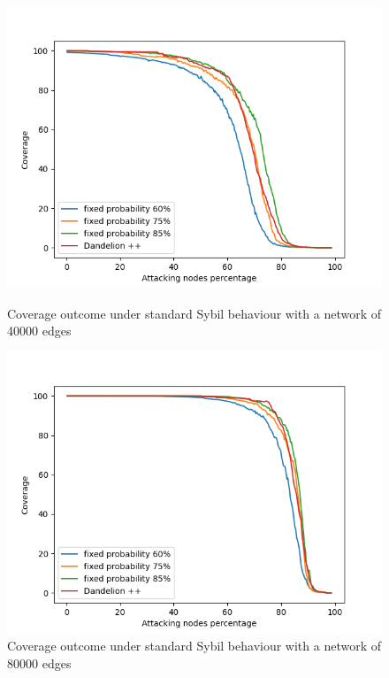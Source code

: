     \begin{figure}[ht]
        \begin{minipage}[b]{0.5\linewidth}
            \includegraphics[width=1.1\textwidth]{pict/results/noatk-40.png}
			\centering 
			\caption{Coverage outcome under standard Sybil behaviour with a network of 40000 edges}
			\label{fig:noatk40}
        \end{minipage}
        \hspace{0.5cm}
        \begin{minipage}[b]{0.5\linewidth}
            \includegraphics[width=1.1\textwidth]{pict/results/noatk-80.png}
			\centering 
			\caption{Coverage outcome under standard Sybil behaviour with a network of 80000 edges}
			\label{fig:notatk80}
        \end{minipage}
    \end{figure}

